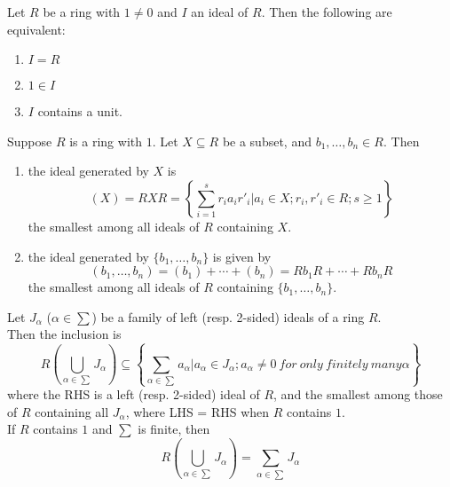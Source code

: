 \begin{proposition}
Let $R$ be a ring with $1 \neq 0$ and $I$ an ideal of $R$. Then the following are equivalent:
\begin{enumerate}[label=(\roman*)]
\item $I = R$
\item $1 \in I$
\item $I$ contains a unit.	
\end{enumerate}
\end{proposition}


\begin{proposition}
Suppose $R$ is a ring with $1$. Let $X \subseteq R$ be a subset, and $b_1, \ldots, b_n \in R$. Then
\begin{enumerate}[label=(\roman*)]
\item the ideal generated by $X$ is
\begin{equation}
(X)=RXR=\left\{ \sum_{i=1}^{s} r_i a_i r'_i | a_i \in X; r_i, r'_i \in R; s \geq 1\right\} \nonumber
\end{equation} 
the smallest among all ideals of $R$ containing $X$.
\item the ideal generated by $\{b_1, \ldots, b_n\}$ is given by 
\begin{equation}
(b_1, \ldots, b_n) = (b_1) + \cdots + (b_n) = Rb_1R + \cdots + Rb_nR \nonumber
\end{equation}
the smallest among all ideals of $R$ containing $\{b_1, \ldots, b_n\}$.
\end{enumerate}
\end{proposition}


\begin{proposition}
Let $J_\alpha$ ($\alpha \in \sum$) be a family of left (resp. 2-sided) ideals of a ring $R$.\\
Then the inclusion is
\begin{equation}
R(\bigcup\limits_{\alpha \in \sum}J_{\alpha}) \subseteq \left\{\sum_{\alpha \in \sum} a_{\alpha} | a_{\alpha} \in J_\alpha; a_{\alpha} \neq 0 \ for \ only \ finitely \ many \alpha \right\} \nonumber
\end{equation}
where the RHS is a left (resp. 2-sided) ideal of $R$, and the smallest among those of $R$ containing all $J_\alpha$, where LHS = RHS when $R$ contains $1$.\\
If $R$ contains $1$ and $\sum$ is finite, then
\begin{equation}
R(\bigcup\limits_{\alpha \in \sum}J_{\alpha}) = \sum_{\alpha \in \sum} J_{\alpha} \nonumber
\end{equation}
\end{proposition}


